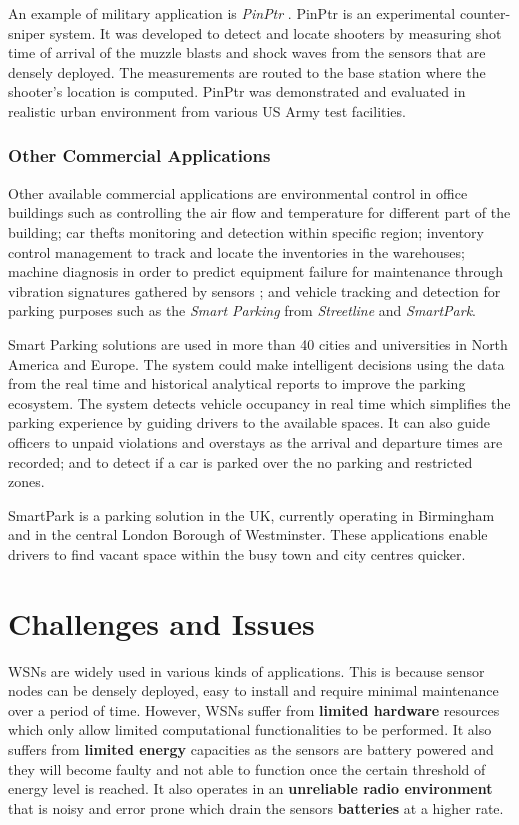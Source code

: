 An example of military application is \textit{PinPtr} \cite{Simonpinptr}. PinPtr is an experimental counter-sniper system. It was developed to detect and locate shooters by measuring shot time of arrival of the muzzle blasts and shock waves from the sensors that are densely deployed. The measurements are routed to the base station where the shooter's location is computed. PinPtr was demonstrated and evaluated in realistic urban environment from various US Army test facilities.

\subsubsection{Other Commercial Applications}
Other available commercial applications are environmental control in office buildings such as controlling the air flow and temperature for different part of the building; car thefts monitoring and detection within specific region; inventory control management to track and locate the inventories in the warehouses; machine diagnosis in order to predict equipment failure for maintenance through vibration signatures gathered by sensors \cite{industrialsensor}; and vehicle tracking and detection for parking purposes such as the \textit{Smart Parking} from \textit{Streetline} and \textit{SmartPark}. 

Smart Parking solutions are used in more than 40 cities and universities in North America and Europe. The system could make intelligent decisions using the data from the real time and historical analytical reports to improve the parking ecosystem. The system detects vehicle occupancy in real time which simplifies the parking experience by guiding drivers to the available spaces. It can also guide officers to unpaid violations and overstays as the arrival and departure times are recorded; and to detect if a car is parked over the no parking and restricted zones. 

SmartPark is a parking solution in the UK, currently operating in Birmingham and in the central London Borough of Westminster. These applications enable drivers to find vacant space within the busy town and city centres quicker.

\section{Challenges and Issues}
WSNs are widely used in various kinds of applications. This is because sensor nodes can be densely deployed, easy to install and require minimal maintenance over a period of time. However, WSNs suffer from \textbf{limited hardware} resources which only allow limited computational functionalities to be performed. It also suffers from \textbf{limited energy} capacities as the sensors are battery powered and they will become faulty and not able to function once the certain threshold of energy level is reached. It also operates in an \textbf{unreliable radio environment} that is noisy and error prone which drain the sensors \textbf{batteries} at a higher rate.

